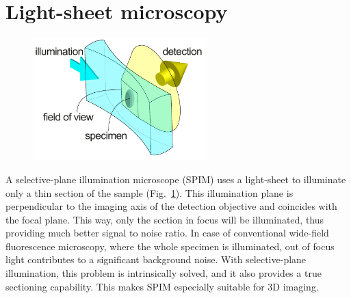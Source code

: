     




\section{Light-sheet microscopy}
  \label{sec:light-sheet}
  \begin{figure}[bt]
    \centering
    \includegraphics[width=0.6\textwidth]{spim_concept}
    \label{fig:spim_concept}
  \end{figure}

  A selective-plane illumination microscope (SPIM) uses a light-sheet to illuminate only a thin section of the sample (Fig.~\ref{fig:spim_concept}). This illumination plane is perpendicular to the imaging axis of the detection objective and coincides with the focal plane. This way, only the section in focus will be illuminated, thus providing much better signal to noise ratio. In case of conventional wide-field fluorescence microscopy, where the whole specimen is illuminated, out of focus light contributes to a significant background noise. 
  With selective-plane illumination, this problem is intrinsically solved, and it also provides a true sectioning capability. This makes SPIM especially suitable for 3D imaging.

